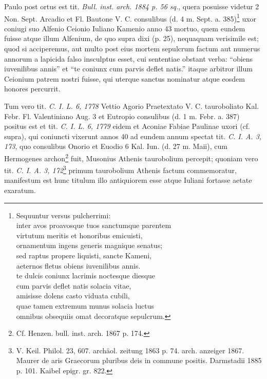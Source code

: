 \documentclass[a4paper, 11pt, oneside, polutonikogreek, german, twocolumn]{article}
\begin{document}
Paulo post ortus est tit. \emph{Bull. inst. arch. 1884 p. 56 sq.}, quera posuisse videtur 2 Non. Sept. Arcadio et Fl. Bautone V. C. consulibus (d. 4 m. Sept. a. 385)\footnote{Sequuntur versus pulcherrimi:\\\hspace*{10mm}inter avos proavosque tuos sanctumque parentem\\\hspace*{10mm}virtutum meritis et honoribus emicuisti,\\\hspace*{10mm}ornamentum ingens generis magnique senatus;\\\hspace*{10mm}sed raptus propere liquisti, sancte Kameni,\\\hspace*{10mm}aeternos fletus obiens iuvenilibus annis.\\\hspace*{10mm}te dulcis coniunx lacrimis noctesque diesque\\\hspace*{10mm}cum parvis deflet natis solacia vitae,\\\hspace*{10mm}amisisse dolens casto viduata cubili,\\\hspace*{10mm}quae tamen extremum munus solacia luctus\\\hspace*{10mm}omnibus obsequiis omat decoratque sepulcrum.} uxor coniugi suo Alfenio Ceionio Iuliano Kamenio anno 43 mortuo, quem eundem fuisse atque illum Alfenium, de quo supra dixi (p. 25), nequaquam verisimile est; quod si acciperemus, aut multo post eius mortem sepulcrum factum aut numerus annorum a lapicida falso insculptus esset, cui sententiae obstant verba: "`obiens iuvenilibus annis"' et "`te coniunx cum parvis deflet natis."' itaque arbitror illum Ceionium patrem nostri fuisse, qui uterque sanctus nominatur atque eosdem honores percurrit.

Tum vero tit. \emph{C. I. L. 6, 1778} Vettio Agorio Praetextato V. C. tauroboliato Kal. Febr. Fl. Valentiniano Aug. 3 et Eutropio consulibus (d. 1 m. Febr. a. 387) positus est et tit. \emph{C. I. L. 6, 1779} eidem et Aconiae Fabiae Paulinae uxori (cf. supra), qui coniuncti vixerunt annos 40 ad eundem annum spectat tit. \emph{C. I. A. 3, 173}, quo consulibus Onorio et Euodio 6 Kal. Iun. (d. 27 m. Maii), cum Hermogenes archon\footnote{Cf. Henzen. bull. inst. arch. 1867 p. 174.} fuit, Musonius Athenis taurobolium percepit; quoniam vero tit. \emph{C. I. A. 3, 172}\footnote{V. Keil. Philol. 23, 607. archäol. zeitung 1863 p. 74. arch. anzeiger 1867. Maurer de aris Graecorum pluribus deis in commune positis. Darmstadii 1885 p. 101. Kaibel epigr. gr. 822.} primum taurobolium Athenis factum commemoratur, manifestum est hunc titulum illo antiquiorem esse atque Iuliani fortasse aetate exaratum.
\end{document}
